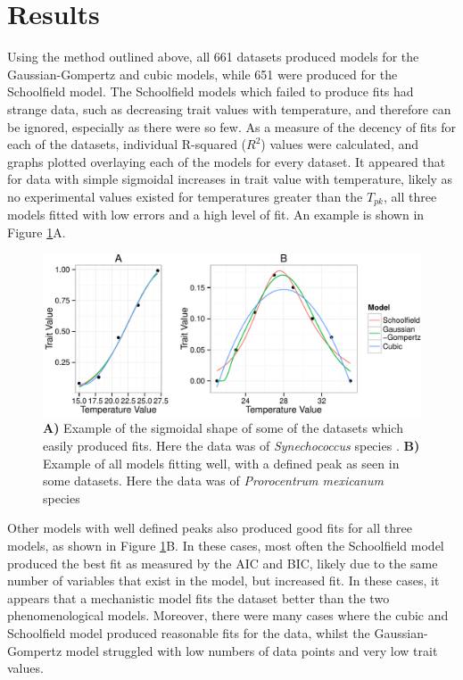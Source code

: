 \documentclass[11pt]{article}
\begin{document}

\section{Results}
Using the method outlined above, all 661 datasets produced models for the Gaussian-Gompertz and cubic models, while 651 were produced for the Schoolfield model. The Schoolfield models which failed to produce fits had strange data, such as decreasing trait values with temperature, and therefore can be ignored, especially as there were so few. As a measure of the decency of fits for each of the datasets, individual R-squared (\(R^2\)) values were calculated, and graphs plotted overlaying each of the models for every dataset. It appeared that for data with simple sigmoidal increases in trait value with temperature, likely as no experimental values existed for temperatures greater than the \(T_{pk}\), all three models fitted with low errors and a high level of fit. An example is shown in Figure \ref{fig:interest}A. 

\begin{figure}[h]
\begin{center}
\includegraphics[scale = 1]{interest.pdf}
\caption{\textbf{A)} Example of the sigmoidal shape of some of the datasets which easily produced fits. Here the data was of \textit{Synechococcus} species \citep{Mackey2013}. \textbf{B)} Example of all models fitting well, with a defined peak as seen in some datasets. Here the data was of \textit{Prorocentrum mexicanum} species \citep{Morton1992}}
\label{fig:interest}
\end{center}
\end{figure}


Other models with well defined peaks also produced good fits for all three models, as shown in Figure \ref{fig:interest}B. In these cases, most often the Schoolfield model produced the best fit as measured by the AIC and BIC, likely due to the same number of variables that exist in the model, but increased fit. In these cases, it appears that a mechanistic model fits the dataset better than the two phenomenological models. Moreover, there were many cases where the cubic and Schoolfield model produced reasonable fits for the data, whilst the Gaussian-Gompertz model struggled with low numbers of data points and very low trait values. 
\end{document}
